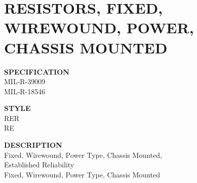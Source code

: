 \section{RESISTORS, FIXED, WIREWOUND, POWER, CHASSIS MOUNTED}

\begin{minipage}[t]{0.24\textwidth}
    \textbf{SPECIFICATION}\\
    MIL-R-39009\\MIL-R-18546
\end{minipage}
\hfill
\begin{minipage}[t]{0.12\textwidth}
    \textbf{STYLE}\\
    RER\\RE
\end{minipage}
\hfill
\begin{minipage}[t]{0.61\textwidth}
    \textbf{DESCRIPTION}\\
    Fixed, Wirewound, Power Type, Chassis Mounted,\\Established Reliability\\Fixed, Wirewound, Power Type, Chassis Mounted
\end{minipage}

